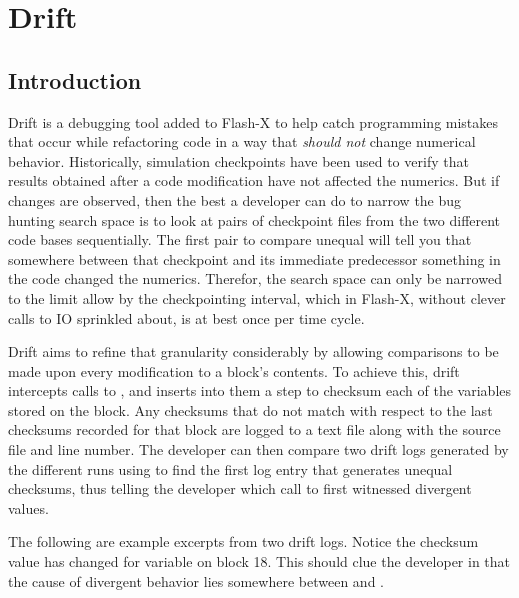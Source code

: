 \chapter{Drift}
\label{Chp:drift}
\section{Introduction}
Drift is a debugging tool added to Flash-X to help catch programming mistakes
that occur while refactoring code in a way that \emph{should not} change
numerical behavior.  Historically, simulation checkpoints have been used to
verify that results obtained after a code modification have not affected the
numerics. But if changes are observed, then the best a developer can do to
narrow the bug hunting search space is to look at pairs of checkpoint files
from the two different code bases sequentially.  The first pair to compare
unequal will tell you that somewhere between that checkpoint and its immediate
predecessor something in the code changed the numerics.  Therefor, the search
space can only be narrowed to the limit allow by the checkpointing interval,
which in Flash-X, without clever calls to IO sprinkled about, is at best once per
time cycle.

Drift aims to refine that granularity considerably by allowing comparisons to
be made upon every modification to a block's contents.  To achieve this, drift
intercepts calls to , and inserts into them a step to
checksum each of the variables stored on the block.  Any checksums that do not
match with respect to the last checksums recorded for that block are logged
to a text file along with the source file and line number.  The developer can
then compare two drift logs generated by the different runs using 
to find the first log entry that generates unequal checksums, thus telling the
developer which call to  first witnessed divergent values.

The following are example excerpts from two drift logs.  Notice the
checksum value has changed for variable  on block 18.  This should clue
the developer in that the cause of divergent behavior lies somewhere between
 and .

